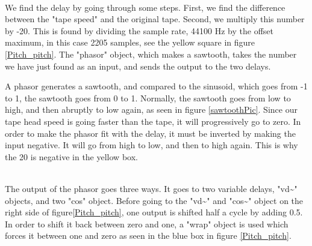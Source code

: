 \begin{minipage}{\linewidth}%
\label{Pitch_pitch}
\end{minipage}\\

We find the delay by going through some steps. First, we find the difference between the "tape speed" and the original tape. Second, we multiply this number by -20. This is found by dividing the sample rate, 44100 Hz by the offset maximum, in this case 2205 samples, see the yellow square in figure \ref{Pitch_pitch}. The "phasor" object, which makes a sawtooth, takes the number we have just found as an input, and sends the output to the two delays. 

A phasor generates a sawtooth, and compared to the sinusoid, which goes from -1 to 1, the sawtooth goes from 0 to 1\citep{FlossManuals}. Normally, the sawtooth goes from low to high, and then abruptly to low again, as seen in figure \ref{sawtoothPic}. Since our tape head speed is going faster than the tape, it will progressively go to zero. In order to make the phasor fit with the delay, it must be inverted by making the input negative. It will go from high to low, and then to high again. This is why the 20 is negative in the yellow box.   

\begin{minipage}{\linewidth}%
\label{sawtoothPic}
\end{minipage}\\

The output of the phasor goes three ways. It goes to two variable delays, "vd\textasciitilde" objects, and two "cos" object. Before going to the "vd\textasciitilde" and "cos\textasciitilde" object on the right side of figure\ref{Pitch_pitch}, one output is shifted half a cycle by adding 0.5. In order to shift it back between zero and one, a "wrap" object is used which forces it between one and zero as seen in the blue box in figure \ref{Pitch_pitch}.\\

